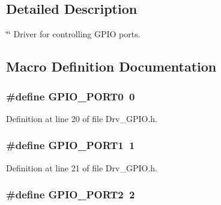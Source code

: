 \subsection{Detailed Description}
\char`\"{}\char`\"{} Driver for controlling G\+P\+IO ports. 

\subsection{Macro Definition Documentation}
\subsubsection[{\texorpdfstring{G\+P\+I\+O\+\_\+\+P\+O\+R\+T0}{GPIO_PORT0}}]{\setlength{\rightskip}{0pt plus 5cm}\#define G\+P\+I\+O\+\_\+\+P\+O\+R\+T0~0}\hypertarget{group__GPIO__Library_gad1230a811f6bc942c555ee29f8e94492}{}\label{group__GPIO__Library_gad1230a811f6bc942c555ee29f8e94492}


Definition at line 20 of file Drv\+\_\+\+G\+P\+I\+O.\+h.

\subsubsection[{\texorpdfstring{G\+P\+I\+O\+\_\+\+P\+O\+R\+T1}{GPIO_PORT1}}]{\setlength{\rightskip}{0pt plus 5cm}\#define G\+P\+I\+O\+\_\+\+P\+O\+R\+T1~1}\hypertarget{group__GPIO__Library_ga4135ea22c25d40b07b0a6efd9bd04afc}{}\label{group__GPIO__Library_ga4135ea22c25d40b07b0a6efd9bd04afc}


Definition at line 21 of file Drv\+\_\+\+G\+P\+I\+O.\+h.

\subsubsection[{\texorpdfstring{G\+P\+I\+O\+\_\+\+P\+O\+R\+T2}{GPIO_PORT2}}]{\setlength{\rightskip}{0pt plus 5cm}\#define G\+P\+I\+O\+\_\+\+P\+O\+R\+T2~2}\hypertarget{group__GPIO__Library_gafd8ac6f9c2840f934bd64c5d1afbee1b}{}\label{group__GPIO__Library_gafd8ac6f9c2840f934bd64c5d1afbee1b}


